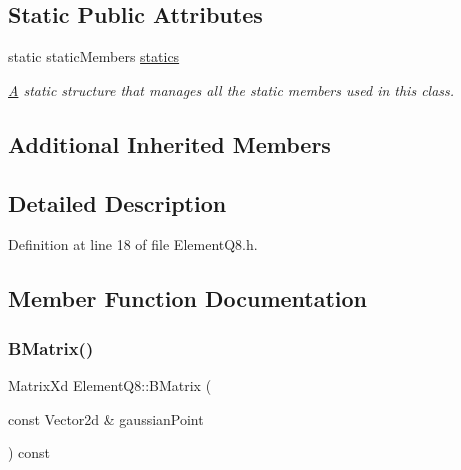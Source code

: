 \subsection*{Static Public Attributes}
\begin{DoxyCompactItemize}
\item 
\mbox{\label{class_element_q8_a62510ae2d4322be38825928a1f0e2747}} 
static static\+Members \mbox{\hyperlink{class_element_q8_a62510ae2d4322be38825928a1f0e2747}{statics}}
\begin{DoxyCompactList}\small\item\em \mbox{\hyperlink{class_a}{A}} static structure that manages all the static members used in this class. \end{DoxyCompactList}\end{DoxyCompactItemize}
\subsection*{Additional Inherited Members}


\subsection{Detailed Description}


Definition at line 18 of file Element\+Q8.\+h.



\subsection{Member Function Documentation}
\mbox{\label{class_element_q8_afb41facf96d5bb4be5162724699e3e02}} 
\subsubsection{\texorpdfstring{B\+Matrix()}{BMatrix()}}
{\footnotesize\ttfamily Matrix\+Xd Element\+Q8\+::\+B\+Matrix (\begin{DoxyParamCaption}\item[{const Vector2d \&}]{gaussian\+Point }\end{DoxyParamCaption}) const\hspace{0.3cm}{\ttfamily [virtual]}}



